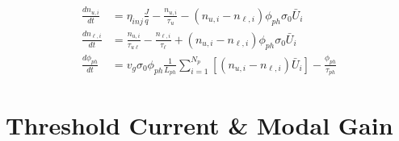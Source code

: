 \documentclass[12pt]{report}
\begin{document}
{\begin{subequations}
\label{chpt1eqn:req_sheet}
\begin{align}
\frac{d n_{u,i}}{dt}&=\eta_{inj} \frac{J}{q} - \frac{n_{u,i}}{\tau_u} - \left( n_{u,i} - n_{\ell,i}\right) \phi_{ph} \sigma_0 \bar{U}_i
\label{chpt1eqn:req_sheeta}\\
%
\frac{d n_{\ell,i}}{dt}&=\frac{n_{u,i}}{\tau_{u\ell}}-\frac{n_{\ell,i}}{\tau_\ell} + \left( n_{u,i} - n_{\ell,i}\right) \phi_{ph} \sigma_0 \bar{U}_i
\label{chpt1eqn:req_sheetb}\\
%
\frac{d \phi_{ph}}{dt}&=v_g \sigma_0 \phi_{ph} \frac{1}{L_{ph}} \sum_{i=1}^{N_p}\left[ \left(n_{u,i} - n_{\ell,i}\right) \bar{U}_i \right] - \frac{\phi_{ph}}{\tau_{ph}}
\label{chpt1eqn:req_sheetc}
\end{align}
\end{subequations}

\section{Threshold Current \& Modal Gain}


}
\end{document}
